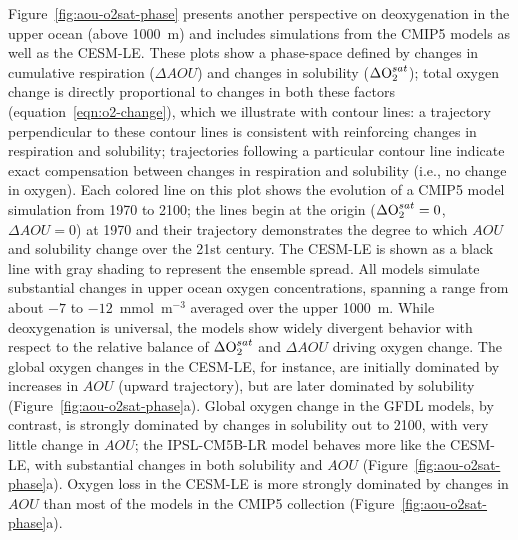 \documentclass[draft,linenumbers]{report_chapter}
\begin{document}
Figure~\ref{fig:aou-o2sat-phase} presents another perspective on deoxygenation in the upper ocean (above 1000~m) and includes simulations from the CMIP5 models as well as the CESM-LE.
These plots show a phase-space defined by changes in cumulative respiration ($\Delta{}AOU$) and changes in solubility ($\Delta{}\ce{O2}^{sat}$); total oxygen change is directly proportional to changes in both these factors (equation~\ref{eqn:o2-change}), which we illustrate with contour lines: a trajectory perpendicular to these contour lines is consistent with reinforcing changes in respiration and solubility; trajectories following a particular contour line indicate exact compensation between changes in respiration and solubility (i.e., no change in oxygen).
Each colored line on this plot shows the evolution of a CMIP5 model simulation from 1970 to 2100; the lines begin at the origin ($\Delta\ce{O2}^{sat} = 0$, $\Delta{}AOU=0$) at 1970 and their trajectory demonstrates the degree to which $AOU$ and solubility change over the 21st century.
The CESM-LE is shown as a black line with gray shading to represent the ensemble spread.
All models simulate substantial changes in upper ocean oxygen concentrations, spanning a range from about $-7$ to $-12$~mmol~m$^{-3}$ averaged over the upper 1000~m.
While deoxygenation is universal, the models show widely divergent behavior with respect to the relative balance of $\Delta\ce{O2}^{sat}$ and $\Delta{}AOU$ driving oxygen change.
The global oxygen changes in the CESM-LE, for instance, are initially dominated by increases in $AOU$ (upward trajectory), but are later dominated by solubility (Figure~\ref{fig:aou-o2sat-phase}a).
Global oxygen change in the GFDL models, by contrast, is strongly dominated by changes in solubility out to 2100, with very little change in $AOU$; the IPSL-CM5B-LR model behaves more like the CESM-LE, with substantial changes in both solubility and $AOU$ (Figure~\ref{fig:aou-o2sat-phase}a).
Oxygen loss in the CESM-LE is more strongly dominated by changes in $AOU$ than most of the models in the CMIP5 collection (Figure~\ref{fig:aou-o2sat-phase}a).
\end{document}
